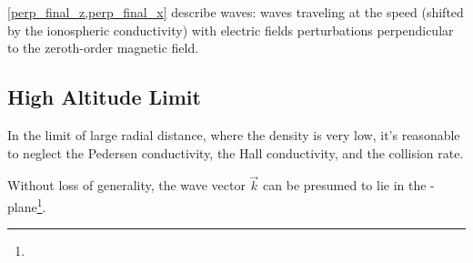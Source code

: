 \cref{perp_final_z,perp_final_x} describe \Alfven waves: waves traveling at the \Alfven speed (shifted by the ionospheric conductivity) with electric fields perturbations perpendicular to the zeroth-order magnetic field.  



\subsection{High Altitude Limit}
  \label{sec_high_alt}

In the limit of large radial distance, where the density is very low, it's reasonable to neglect the Pedersen conductivity, the Hall conductivity, and the collision rate. 

Without loss of generality, the wave vector $\vec{k}$ can be presumed to lie in the \x-\z plane\footnote{}. 


